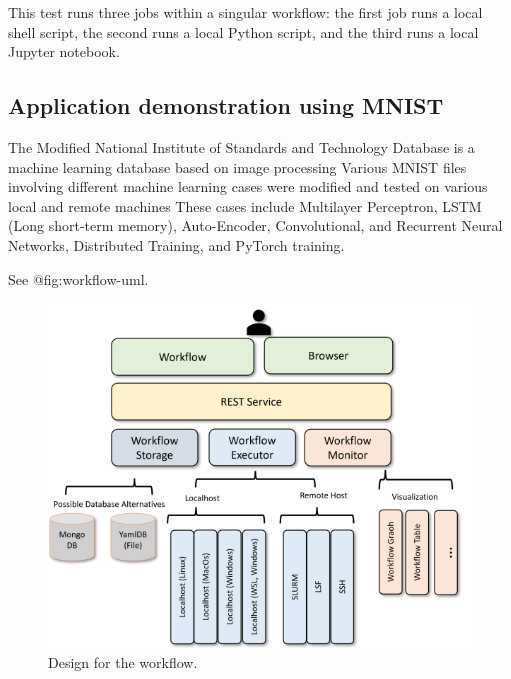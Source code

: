 \begin{Shaded}
\begin{Highlighting}[]
\NormalTok{ \textasciitilde{}}
   \OperatorTok{=}
\end{Highlighting}
\end{Shaded}

This test runs three jobs within a singular workflow: the first job runs
a local shell script, the second runs a local Python script, and the
third runs a local Jupyter notebook.

\hypertarget{application-demonstration-using-mnist}{%
\subsection{Application demonstration using
MNIST}\label{application-demonstration-using-mnist}}

The Modified National Institute of Standards and Technology Database is
a machine learning database based on image processing Various MNIST
files involving different machine learning cases were modified and
tested on various local and remote machines These cases include
Multilayer Perceptron, LSTM (Long short-term memory), Auto-Encoder,
Convolutional, and Recurrent Neural Networks, Distributed Training, and
PyTorch training.

See @fig:workflow-uml.

\begin{figure}
\hypertarget{fig:workflow-uml}{%
\centering
\includegraphics{images/workflow-uml.png}
\caption{Design for the workflow.}\label{fig:workflow-uml}
}
\end{figure}

